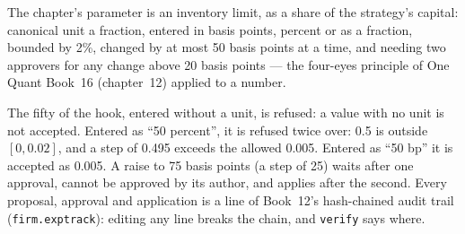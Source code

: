 The chapter's parameter is an inventory limit, as a share of the strategy's capital: canonical unit a fraction, entered in basis points,
percent or as a fraction, bounded by 2\%, changed by at most 50 basis points at a time, and needing two approvers for any change above 20 basis
points --- the four-eyes principle of One Quant Book~16 (chapter~12) applied to a number.

\label{lst:pl:signal-serving-and-parameter-management:propose}

The fifty of the hook, entered without a unit, is refused: a value with no unit is not accepted. Entered as ``50 percent'', it is refused twice over: 0.5 is
outside $[0, 0.02]$, and a step of 0.495 exceeds the allowed 0.005. Entered as ``50 bp'' it is accepted as 0.005. A raise to 75 basis points
(a step of 25) waits after one approval, cannot be approved by its author, and applies after the second. Every proposal, approval and
application is a line of Book~12's hash-chained audit trail (\texttt{firm.exptrack}): editing any line breaks the chain, and
\texttt{verify} says where.

\label{lst:pl:signal-serving-and-parameter-management:approve}

